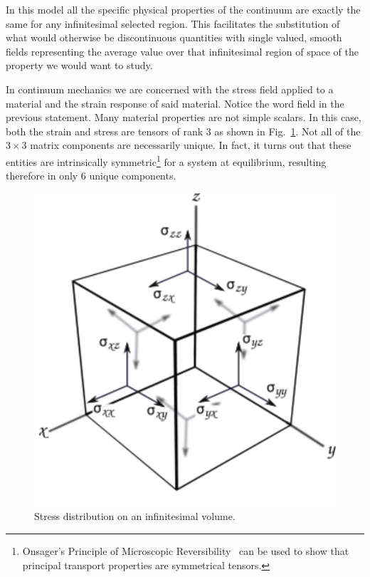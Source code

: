 In this model all the specific physical properties of the continuum are exactly the same for
any infinitesimal selected region. This facilitates the substitution of what would otherwise be discontinuous quantities with single valued, smooth fields representing the average value over that infinitesimal region of space of the property we would want to study. 

In continuum mechanics we are concerned with the stress field applied to a material and the strain response of said material. Notice the word field in the previous statement. Many material properties are not simple scalars. In this case, both the strain and stress are tensors of rank 3 as shown in Fig.~\ref{fig:stress}. Not all of the $3\times 3$ matrix components are necessarily unique. In fact, it turns out that these entities are intrinsically symmetric\footnote{Onsager’s Principle of Microscopic Reversibility~\cite{Onsager} can be used to show that principal transport properties are symmetrical tensors.} for a system at equilibrium, resulting therefore in only 6 unique components.  

\begin{figure}[ht]
    \centering
    \includegraphics[width=0.42\linewidth]{Figures/cubefin.png}
    \caption{Stress distribution on an infinitesimal volume.}
    \label{fig:stress}
\end{figure}

